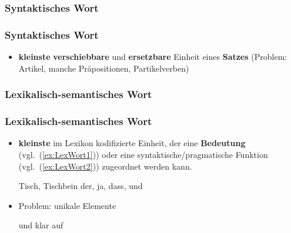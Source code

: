 \subsubsection{Syntaktisches Wort}

\begin{frame}
\frametitle{Syntaktisches Wort}

\begin{itemize}
	\item \textbf{kleinste} \textbf{verschiebbare} und \textbf{ersetzbare} Einheit eines \textbf{Satzes}
	(Problem: Artikel, manche Präpositionen, Partikelverben)
	
	\ea
		\z 
	\ex 
		\z 
	\z
	
%	

\end{itemize}

\end{frame}


\subsubsection{Lexikalisch-semantisches Wort}


\begin{frame}
\frametitle{Lexikalisch-semantisches Wort}

\begin{itemize}
	\item \textbf{kleinste} im Lexikon kodifizierte Einheit, der eine \textbf{Bedeutung} (vgl.\ (\ref{ex:LexWort1})) oder eine syntaktische/pragmatische Funktion (vgl.\ (\ref{ex:LexWort2})) zugeordnet werden kann.
	
	\ea 
		\ea\label{ex:LexWort1} Tisch, Tischbein
		\ex\label{ex:LexWort2} der, ja, dass, und 
		\z 
	\z 

	\item Problem: unikale Elemente
	
	\ea 
		\ea {} und klar
		\ex auf 
		\z 
	\z 
	

\end{itemize}

\end{frame}


